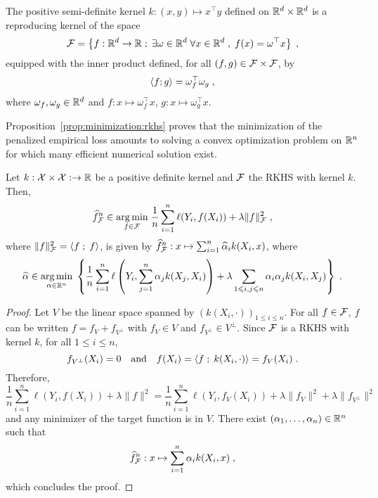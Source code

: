 \begin{remark}
The positive semi-definite kernel $k:(x,y)\mapsto x^\top y$ defined on $\mathbb{R}^d\times\mathbb{R}^d$ is a reproducing kernel of the space
$$
\mathcal{F} = \left\{f: \mathbb{R}^d\to\mathbb{R}\;;\; \exists \omega\in\mathbb{R}^d \;\forall x\in \mathbb{R}^d\;, \; f(x) = \omega^\top x\right\}\;,
$$
equipped with the inner product defined, for all $(f,g)\in\mathcal{F}\times\mathcal{F}$, by 
$$
\langle f; g\rangle = \omega_f^\top \omega_g\;, 
$$
where $\omega_f,\omega_g\in\mathbb{R}^d$ and $f: x\mapsto \omega_f^\top x$, $g: x\mapsto \omega_g^\top x$. 
\end{remark}

Proposition~\ref{prop:minimization:rkhs} proves that the minimization of the penalized empirical loss amounts to solving a convex optimization problem on $\mathbb{R}^n$ for which many efficient  numerical solution exist.
\begin{shaded}
\begin{proposition}
\label{prop:minimization:rkhs}
Let $k:\mathcal{X}\times\mathcal{X}:\to \mathbb{R}$ be a positive definite kernel and $\mathcal{F}$ the RKHS with kernel $k$. Then, 
\[
\widehat f^n_{\calF} \in \underset{f\in\calF}{\argmin}\;\frac{1}{n}\sum_{i=1}^n \ell(Y_i,f(X_i)) + \lambda\|f\|_\calF^2\eqsp,
\]
where $\|f\|^2_{\mathcal{F}} = \langle f\;;\; f\rangle$, is given by $\widehat f^n_{\mathcal{F}} : x \mapsto \sum_{i=1}^n \widehat \alpha_i k(X_i,x)$, where
\[
\widehat\alpha \in \underset{\alpha \in \rset^n}{\argmin}\;\left\{\frac{1}{n}\sum_{i=1}^n \ell\left(Y_i,\sum_{j=1}^n\alpha_jk(X_j,X_i)\right) + \lambda \sum_{1\leqslant i,j \leqslant n}\alpha_i \alpha_j k(X_i,X_j)\right\}\eqsp.
\]
\end{proposition}
\end{shaded}
\begin{proof}
Let $V$ be the linear space spanned by $(k(X_i,\cdot))_{1\leqslant i\leqslant n}$. For all $f\in\mathcal{F}$, $f$ can be written $f = f_V + f_{V^\perp}$ with $f_V\in V$ and $f_{V^\perp}\in V^\perp$. Since $\mathcal{F}$ is a RKHS with kernel $k$, for all $1\leqslant i \leqslant n$,
\[
f_{V^\perp}(X_i) = 0\quad \mathrm{and} \quad f(X_i) = \langle f\;;\; k(X_i,\cdot)\rangle = f_V(X_i)\;.
\]
Therefore,
\[
\frac{1}{n}\sum_{i=1}^n \ell(Y_i,f(X_i)) + \lambda\|f\|^2 = \frac{1}{n}\sum_{i=1}^n \ell(Y_i,f_V(X_i)) + \lambda\|f_V\|^2 + \lambda\|f_{V^\perp}\|^2
\]
and any minimizer of the target function is in $V$. There exist $(\alpha_1,\ldots,\alpha_n)\in \mathbb{R}^n$ such that 
\[
\widehat f^n_{\mathcal{F}} :x\mapsto \sum_{i=1}^n \alpha_i k(X_i,x)\;,
\]
which concludes the proof.
\end{proof}
